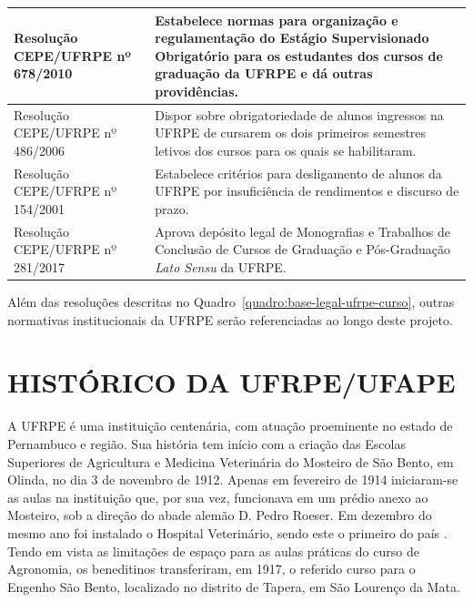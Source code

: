 \documentclass[
	12pt,				%
	openright,			%
  oneside,     %
	a4paper,			%
	chapter=TITLE,		%
	english,			%
	french,				%
	spanish,			%
	brazil				%
	]{abntex2}
\begin{document}
\begin{center}
\begin{scriptsize}
\begin{longtable}{@{}lp{8.7cm}}
    Resolução CEPE/UFRPE nº 678/2010 & Estabelece normas para organização e regulamentação do Estágio Supervisionado Obrigatório para os estudantes dos cursos de graduação da UFRPE e dá outras providências. \\ \midrule
    Resolução CEPE/UFRPE nº 486/2006 & Dispor sobre obrigatoriedade de alunos ingressos na UFRPE de cursarem os dois primeiros semestres letivos dos cursos para os quais se habilitaram. \\ \midrule
    Resolução CEPE/UFRPE nº 154/2001 & Estabelece critérios para desligamento de alunos da UFRPE por insuficiência de rendimentos e discurso de prazo. \\ \midrule
    Resolução CEPE/UFRPE nº 281/2017 & Aprova depósito legal de Monografias e Trabalhos de Conclusão de Cursos de Graduação e Pós-Graduação \textit{Lato Sensu} da UFRPE.\\
    \bottomrule
    \end{longtable}
\end{scriptsize}     
\end{center}

Além das resoluções descritas no Quadro~\ref{quadro:base-legal-ufrpe-curso}, outras normativas institucionais da UFRPE serão referenciadas ao longo deste projeto.


\chapter{HISTÓRICO DA UFRPE/UFAPE}

A UFRPE é uma instituição centenária, com atuação proeminente no estado de Pernambuco e região. Sua história tem início com a criação das Escolas Superiores de Agricultura e Medicina Veterinária do Mosteiro de São Bento, em Olinda, no dia 3 de novembro de 1912. Apenas em fevereiro de 1914 iniciaram-se as aulas na instituição que, por sua vez, funcionava em um prédio anexo ao Mosteiro, sob a direção do abade alemão D. Pedro Roeser. Em dezembro do mesmo ano foi instalado o Hospital Veterinário, sendo este o primeiro do país \cite{melo2010alveitares}. Tendo em vista as limitações de espaço para as aulas práticas do curso de Agronomia, os beneditinos transferiram, em 1917, o referido curso para o Engenho São Bento, localizado no distrito de Tapera, em São Lourenço da Mata.
\end{document}
